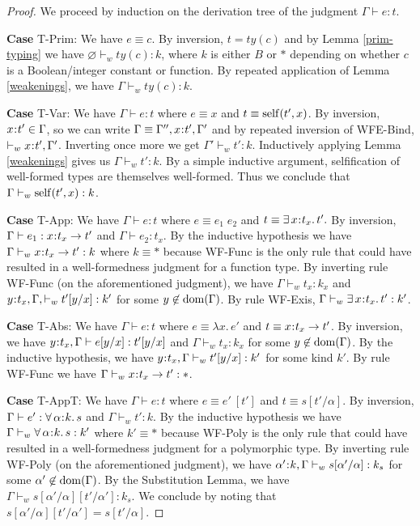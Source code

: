 \documentclass[11pt]{article}
\newcommand{\al}{\alpha}
\newcommand{\bind}{\hspace{0.05em}{:}\hspace{0.05em}} %
\newcommand{\existype}[3]{\exists\, #1\bind #2.\, #3}
\newcommand{\polytype}[3]{\forall\, #1\bind #2.\, #3}
\newcommand{\functype}[3]{#1\bind #2 \rightarrow #3}
\newcommand{\dom}[1]{{\rm dom}(#1)}
\begin{document}
\begin{proof} 
We proceed by induction on the derivation tree of the judgment $\Gamma \vdash e : t$.

{\bf Case} {\sc T-Prim}: We have $e \equiv c$. By inversion, $t = ty(c)$ and by Lemma \ref{prim-typing} we have $\varnothing \vdash_ w ty(c) : k$, where $k$ is either $B$ or $*$ depending on whether $c$ is a Boolean/integer constant or function. By repeated application of Lemma \ref{weakenings}, we have $\Gamma \vdash_w ty(c) : k$. 

{\bf Case} {\sc T-Var}: We have $\Gamma \vdash e : t$ where $e \equiv x$ and $t \equiv {\rm self}(t',x)$. By inversion, $x\bind t' \in \Gamma$, so we can write $\Gamma \equiv \Gamma'', x\bind t',\Gamma'$ and by repeated inversion of {\sc WFE-Bind}, $\vdash_w x\bind t',\Gamma'$. Inverting once more we get $\Gamma' \vdash_w t' : k$. Inductively applying Lemma \ref{weakenings} gives us $\Gamma \vdash_w t' : k$. By a simple inductive argument, selfification of well-formed types are themselves well-formed. Thus we conclude that $\Gamma \vdash_w {\rm self}(t',x) : k$.

{\bf Case} {\sc T-App}: We have $\Gamma \vdash e : t$ where $e \equiv e_1\; e_2$ and $t \equiv \existype{x}{t_x}{t'}.$ By inversion, $\Gamma \vdash e_1 : \functype{x}{t_x}{t'}$ and $\Gamma \vdash e_2 : t_x$. By the inductive hypothesis we have $\Gamma \vdash_w \functype{x}{t_x}{t'} : k$ where $k \equiv *$ because {\sc WF-Func} is the only rule that could have resulted in a well-formedness judgment for a function type. By inverting rule {\sc WF-Func} (on the aforementioned judgment), we have $\Gamma \vdash_w t_x : k_x$ and $y\bind t_x, \Gamma, \vdash_w t'[y/x] : k'$ for some $y\not\in\dom{\Gamma}$. By rule {\sc WF-Exis}, $\Gamma \vdash_w \existype{x}{t_x}{t'} : k'$.

{\bf Case} {\sc T-Abs}: We have $\Gamma \vdash e : t$ where $e \equiv \lambda x.\, e'$ and $t \equiv \functype{x}{t_x}{t'}$. By inversion, we have $y\bind t_x,\Gamma \vdash e[y/x] : t'[y/x]$ and $\Gamma \vdash_w t_x : k_x$ for some $y\not\in\dom{\Gamma}$. By the inductive hypothesis, we have $y\bind t_x, \Gamma\vdash_w t'[y/x] : k'$ for some kind $k'$. By rule {\sc WF-Func} we have $\Gamma \vdash_w \functype{x}{t_x}{t'} : *$.

{\bf Case} {\sc T-AppT}: We have $\Gamma \vdash e : t$ where $e \equiv e'\: [t']$ and $t \equiv s[t'/\al]$. By inversion, $\Gamma \vdash e' : \polytype{\al}{k}{s}$ and $\Gamma \vdash_w t' : k$. By the inductive hypothesis we have $\Gamma \vdash_w \polytype{\al}{k}{s} : k'$ where $k' \equiv *$ because {\sc WF-Poly} is the only rule that could have resulted in a well-formedness judgment for a polymorphic type. 
By inverting rule {\sc WF-Poly} (on the aforementioned judgment), we have $\al'\bind k, \Gamma \vdash_w s[\al'/\al] : k_s$ for some $\al'\not\in\dom{\Gamma}$. By the Substitution Lemma, we have $\Gamma \vdash_w s[\al'/\al][t'/\al'] : k_s$. We conclude by noting that  $s[\al'/\al][t'/\al'] = s[t'/\al]$.


\end{proof}
\end{document}
